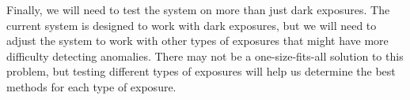 Finally, we will need to test the system on more than just dark exposures.
The current system is designed to work with dark exposures, but we will need to adjust the system to work with other types of exposures that might have more difficulty detecting anomalies.
There may not be a one-size-fits-all solution to this problem, but testing different types of exposures will help us determine the best methods for each type of exposure.